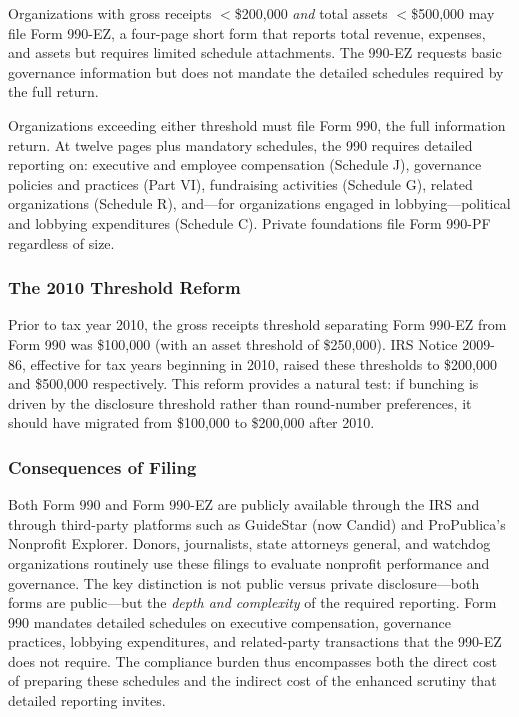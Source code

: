 \documentclass[12pt]{article}
\begin{document}
Organizations with gross receipts $<$\$200,000 \textit{and} total assets $<$\$500,000 may file Form 990-EZ, a four-page short form that reports total revenue, expenses, and assets but requires limited schedule attachments. The 990-EZ requests basic governance information but does not mandate the detailed schedules required by the full return.

Organizations exceeding either threshold must file Form 990, the full information return. At twelve pages plus mandatory schedules, the 990 requires detailed reporting on: executive and employee compensation (Schedule J), governance policies and practices (Part VI), fundraising activities (Schedule G), related organizations (Schedule R), and---for organizations engaged in lobbying---political and lobbying expenditures (Schedule C). Private foundations file Form 990-PF regardless of size.

\subsubsection*{The 2010 Threshold Reform} Prior to tax year 2010, the gross receipts threshold separating Form 990-EZ from Form 990 was \$100,000 (with an asset threshold of \$250,000). IRS Notice 2009-86, effective for tax years beginning in 2010, raised these thresholds to \$200,000 and \$500,000 respectively. This reform provides a natural test: if bunching is driven by the disclosure threshold rather than round-number preferences, it should have migrated from \$100,000 to \$200,000 after 2010.

\subsubsection*{Consequences of Filing} Both Form 990 and Form 990-EZ are publicly available through the IRS and through third-party platforms such as GuideStar (now Candid) and ProPublica's Nonprofit Explorer. Donors, journalists, state attorneys general, and watchdog organizations routinely use these filings to evaluate nonprofit performance and governance. The key distinction is not public versus private disclosure---both forms are public---but the \textit{depth and complexity} of the required reporting. Form 990 mandates detailed schedules on executive compensation, governance practices, lobbying expenditures, and related-party transactions that the 990-EZ does not require. The compliance burden thus encompasses both the direct cost of preparing these schedules and the indirect cost of the enhanced scrutiny that detailed reporting invites.
\end{document}

